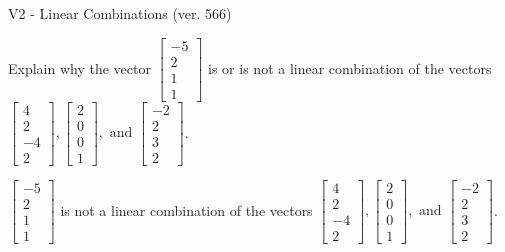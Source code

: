 \begin{exercise}
  \begin{exerciseTitle}V2 - Linear Combinations (ver. 566)\end{exerciseTitle}
  \begin{exerciseStatement}
    Explain why the vector \(\left[\begin{array}{c}
-5 \\
2 \\
1 \\
1
\end{array}\right]\)  is or is not a linear 
	combination of the vectors \(\left[\begin{array}{c}
4 \\
2 \\
-4 \\
2
\end{array}\right] , \left[\begin{array}{c}
2 \\
0 \\
0 \\
1
\end{array}\right] , \text{ and } \left[\begin{array}{c}
-2 \\
2 \\
3 \\
2
\end{array}\right]\).
	


  \end{exerciseStatement}
  \begin{exerciseAnswer}
   \(\left[\begin{array}{c}
-5 \\
2 \\
1 \\
1
\end{array}\right]\) 
  	 is not  
	a linear combination of the vectors \(\left[\begin{array}{c}
4 \\
2 \\
-4 \\
2
\end{array}\right] , \left[\begin{array}{c}
2 \\
0 \\
0 \\
1
\end{array}\right] , \text{ and } \left[\begin{array}{c}
-2 \\
2 \\
3 \\
2
\end{array}\right]\).

	
  


  \end{exerciseAnswer}
\end{exercise}